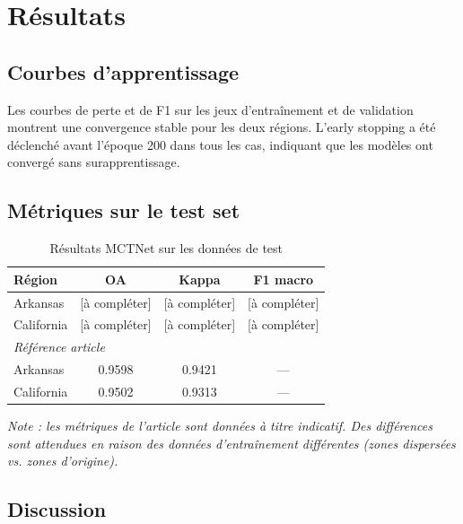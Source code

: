 \section{Résultats}

\subsection{Courbes d'apprentissage}

Les courbes de perte et de F1 sur les jeux d'entraînement et de validation
montrent une convergence stable pour les deux régions. L'early stopping a
été déclenché avant l'époque 200 dans tous les cas, indiquant que les modèles
ont convergé sans surapprentissage.


\subsection{Métriques sur le test set}

\begin{table}[H]
\centering
\caption{Résultats MCTNet sur les données de test}
\label{tab:resultats}
\begin{tabular}{lccc}
\toprule
\textbf{Région} & \textbf{OA} & \textbf{Kappa} & \textbf{F1 macro} \\
\midrule
Arkansas    & [à compléter] & [à compléter] & [à compléter] \\
California  & [à compléter] & [à compléter] & [à compléter] \\
\midrule
\multicolumn{4}{l}{\textit{Référence article \cite{wang2024}}} \\
Arkansas    & 0.9598 & 0.9421 & --- \\
California  & 0.9502 & 0.9313 & --- \\
\bottomrule
\end{tabular}
\end{table}

\textit{Note : les métriques de l'article sont données à titre indicatif.
Des différences sont attendues en raison des données d'entraînement
différentes (zones dispersées vs. zones d'origine).}

\subsection{Discussion}

